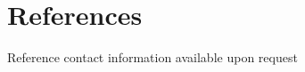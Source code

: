 \documentclass[11pt]{article} %
\begin{document}
\pagebreak[3]
\section{References}
Reference contact information available upon request
\begin{paracol}{2}
    

    

\switchcolumn

    

    


\end{paracol}
\end{document}
